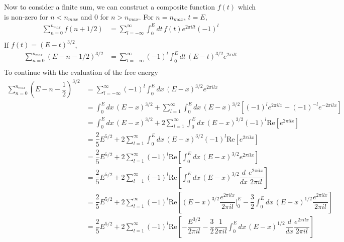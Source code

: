 \documentclass[aps,prb,onecolumn,notitlepage,showpacs,floatfix,superscriptaddress]{revtex4-1}
\begin{document}
Now to consider a finite sum, we can construct a composite function $f(t)$ which is non-zero for $n<n_{max}$ and $0$ for $n>n_{max}$. For $n=n_{max}$, $t=E$,
\begin{equation}
\begin{split}
\sum_{n=0}^{n_{max}} f(n+1/2) &= \sum_{l=-\infty}^\infty  \int_0^E dt \, f(t)  e^{2\pi i l t} (-1)^l \\
\end{split}
\end{equation}
If $f(t)=(E-t)^{3/2}$,
\begin{equation}
\begin{split}
\sum_{n=0}^{n_{max}} (E-n-1/2)^{3/2} &= \sum_{l=-\infty}^\infty  (-1)^l  \int_0^E dt \, (E-t)^{3/2}  e^{2\pi i l t} \\
\end{split}
\end{equation}
\noindent\makebox[\linewidth]{\rule{\textwidth}{0.4pt}}
To continue with the evaluation of the free energy
\begin{equation}
\begin{split}
\sum_{n=0}^{n_{max}}  \left(E - n - \dfrac{1}{2}\right)^{3/2}  &= \sum_{l=-\infty}^\infty (-1)^l \int_0^E dx \, (E-x)^{3/2} e^{2\pi i l x} \\
&= \int_0^E dx \, (E-x)^{3/2}  + \sum_{l=1}^\infty \int_0^E dx \, (E-x)^{3/2} \left[ (-1)^l e^{2\pi i l x} + (-1)^{-l} e^{-2\pi i l x} \right] \\
&= \int_0^E dx \, (E-x)^{3/2}  + 2 \sum_{l=1}^\infty \int_0^E dx \, (E-x)^{3/2} (-1)^l   \text{Re}\left[ e^{2\pi i l x} \right] \\
&= \dfrac{2}{5} E^{5/2} + 2 \sum_{l=1}^\infty \int_0^E dx \, (E-x)^{3/2} (-1)^l   \text{Re}\left[ e^{2\pi i l x} \right] \\
&= \dfrac{2}{5} E^{5/2} + 2 \sum_{l=1}^\infty  (-1)^l   \text{Re}\left[ \int_0^E dx \, (E-x)^{3/2} e^{2\pi i l x} \right] \\
&= \dfrac{2}{5} E^{5/2} + 2 \sum_{l=1}^\infty  (-1)^l   \text{Re}\left[ \int_0^E dx \, (E-x)^{3/2} \dfrac{d}{dx}\dfrac{e^{2\pi i l x}}{2\pi i l} \right]\\
&= \dfrac{2}{5} E^{5/2} + 2 \sum_{l=1}^\infty  (-1)^l   \text{Re}\left[(E-x)^{3/2}\dfrac{e^{2\pi i l x}}{2\pi i l} \bigg\vert_0^E- \dfrac{3}{2} \int_0^E dx \, (E-x)^{1/2} \dfrac{e^{2\pi i l x}}{2\pi i l} \right] \\
&= \dfrac{2}{5} E^{5/2} + 2 \sum_{l=1}^\infty  (-1)^l   \text{Re}\left[-\dfrac{E^{3/2}}{2\pi i l} - \dfrac{3}{2} \dfrac{1}{2\pi i l}\int_0^E dx \, (E-x)^{1/2} \dfrac{d}{dx}\dfrac{e^{2\pi i l x}}{2\pi i l} \right] \\
\end{split}
\end{equation}
\end{document}

